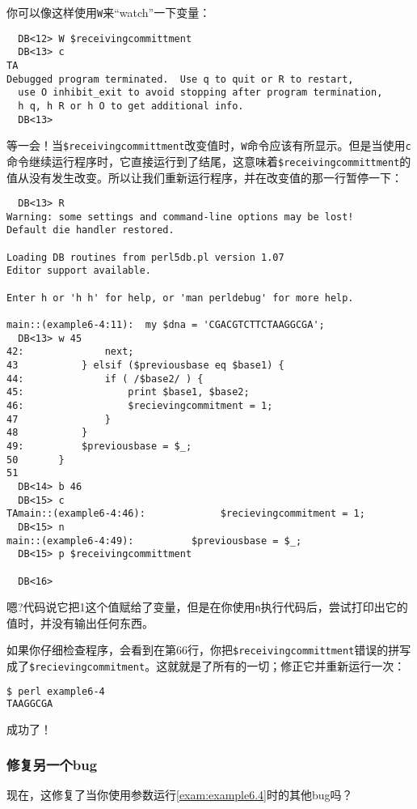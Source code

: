 你可以像这样使用\verb|W|来“watch”一下变量：

\begin{lstlisting}
  DB<12> W $receivingcommittment
  DB<13> c
TA
Debugged program terminated.  Use q to quit or R to restart,
  use O inhibit_exit to avoid stopping after program termination,
  h q, h R or h O to get additional info.  
  DB<13> 
\end{lstlisting}

等一会！当\verb|$receivingcommittment|改变值时，\verb|W|命令应该有所显示。但是当使用\verb|c|命令继续运行程序时，它直接运行到了结尾，这意味着\verb|$receivingcommittment|的值从没有发生改变。所以让我们重新运行程序，并在改变值的那一行暂停一下：

\begin{lstlisting}
  DB<13> R
Warning: some settings and command-line options may be lost!
Default die handler restored.

Loading DB routines from perl5db.pl version 1.07
Editor support available.

Enter h or 'h h' for help, or 'man perldebug' for more help.

main::(example6-4:11):	my $dna = 'CGACGTCTTCTAAGGCGA';
  DB<13> w 45
42:              next;
43           } elsif ($previousbase eq $base1) {
44:              if ( /$base2/ ) {
45:                  print $base1, $base2; 
46:                  $recievingcommitment = 1;
47               }
48           }
49:          $previousbase = $_;
50       }
51
  DB<14> b 46
  DB<15> c
TAmain::(example6-4:46):             $recievingcommitment = 1;
  DB<15> n
main::(example6-4:49):          $previousbase = $_;
  DB<15> p $receivingcommittment

  DB<16> 
\end{lstlisting}

嗯?代码说它把1这个值赋给了变量，但是在你使用\verb|n|执行代码后，尝试打印出它的值时，并没有输出任何东西。

如果你仔细检查程序，会看到在第66行，你把\verb|$receivingcommittment|错误的拼写成了\verb|$recievingcommitment|。这就就是了所有的一切；修正它并重新运行一次：

\begin{lstlisting}[language=bash]
$ perl example6-4
TAAGGCGA 
\end{lstlisting}

成功了！

\subsubsection{修复另一个bug}
现在，这修复了当你使用参数运行\autoref{exam:example6.4}时的其他bug吗？

